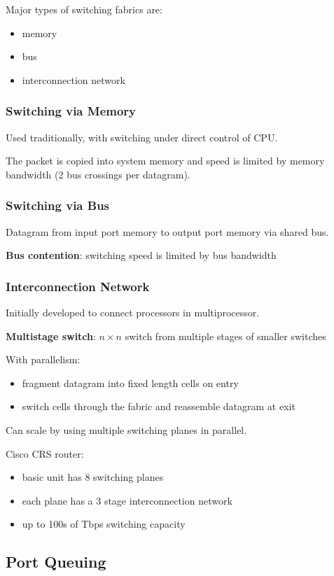 \documentclass[11pt]{article}
\begin{document}
Major types of switching fabrics are:
\begin{itemize}
\item memory
\item bus
\item interconnection network
\end{itemize}
\subsubsection{Switching via Memory}
\label{sec:orgf022c12}
Used traditionally, with switching under direct control of CPU.

The packet is copied into system memory and speed is limited by memory bandwidth
(2 bus crossings per datagram).
\subsubsection{Switching via Bus}
\label{sec:orgd758274}
Datagram from input port memory to output port memory via shared bus.

\textbf{Bus contention}: switching speed is limited by bus bandwidth
\subsubsection{Interconnection Network}
\label{sec:org5963d74}
Initially developed to connect processors in multiprocessor.

\textbf{Multistage switch}: \(n \times n\) switch from multiple stages of smaller switches

With parallelism:
\begin{itemize}
\item fragment datagram into fixed length cells on entry
\item switch cells through the fabric and reassemble datagram at exit
\end{itemize}

Can scale by using multiple switching planes in parallel.

Cisco CRS router:
\begin{itemize}
\item basic unit has 8 switching planes
\item each plane has a 3 stage interconnection network
\item up to 100s of Tbps switching capacity
\end{itemize}
\subsection{Port Queuing}
\label{sec:org0e30395}
\end{document}
